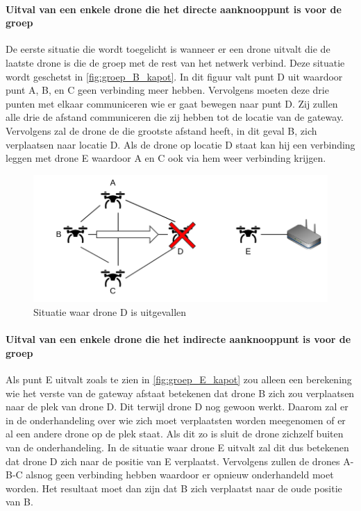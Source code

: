 \documentclass[a4paper, 11pt, oneside]{report}
\begin{document}
\paragraph{Uitval van een enkele drone die het directe aanknooppunt is voor de groep}
De eerste situatie die wordt toegelicht is wanneer er een drone uitvalt die de laatste drone is die de groep met de rest van het netwerk verbind.
Deze situatie wordt geschetst in \autoref{fig:groep_B_kapot}. 
In dit figuur valt punt D uit waardoor punt A, B, en C geen verbinding meer hebben.
Vervolgens moeten deze drie punten met elkaar communiceren wie er gaat bewegen naar punt D.
Zij zullen alle drie de afstand communiceren die zij hebben tot de locatie van de gateway. 
Vervolgens zal de drone de die grootste afstand heeft, in dit geval B, zich verplaatsen naar locatie D.
Als de drone op locatie D staat kan hij een verbinding leggen met drone E waardoor A en C ook via hem weer verbinding krijgen.

\begin{figure}[H]
	\begin{center}\includegraphics[width=.8\linewidth]{Afbeeldingen/droneopstelling_Groep_een_kapot.png}\end{center}
	\caption{Situatie waar drone D is uitgevallen}
	\label{fig:groep_B_kapot}
\end{figure}

\paragraph{Uitval van een enkele drone die het indirecte aanknooppunt is voor de groep}
Als punt E uitvalt zoals te zien in \autoref{fig:groep_E_kapot} zou alleen een berekening wie het verste van de gateway afstaat betekenen dat drone B zich zou verplaatsen naar de plek van drone D.
Dit terwijl drone D nog gewoon werkt.
Daarom zal er in de onderhandeling over wie zich moet verplaatsten worden meegenomen of er al een andere drone op de plek staat.
Als dit zo is sluit de drone zichzelf buiten van de onderhandeling.
In de situatie waar drone E uitvalt zal dit dus betekenen dat drone D zich naar de positie van E verplaatst.
Vervolgens zullen de drones A-B-C alsnog geen verbinding hebben waardoor er opnieuw onderhandeld moet worden. 
Het resultaat moet dan zijn dat B zich verplaatst naar de oude positie van B.  
\end{document}
